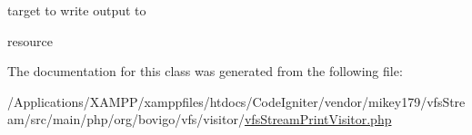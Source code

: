 target to write output to

resource 

The documentation for this class was generated from the following file\+:\begin{DoxyCompactItemize}
\item 
/\+Applications/\+X\+A\+M\+P\+P/xamppfiles/htdocs/\+Code\+Igniter/vendor/mikey179/vfs\+Stream/src/main/php/org/bovigo/vfs/visitor/\mbox{\hyperlink{vfs_stream_print_visitor_8php}{vfs\+Stream\+Print\+Visitor.\+php}}\end{DoxyCompactItemize}
